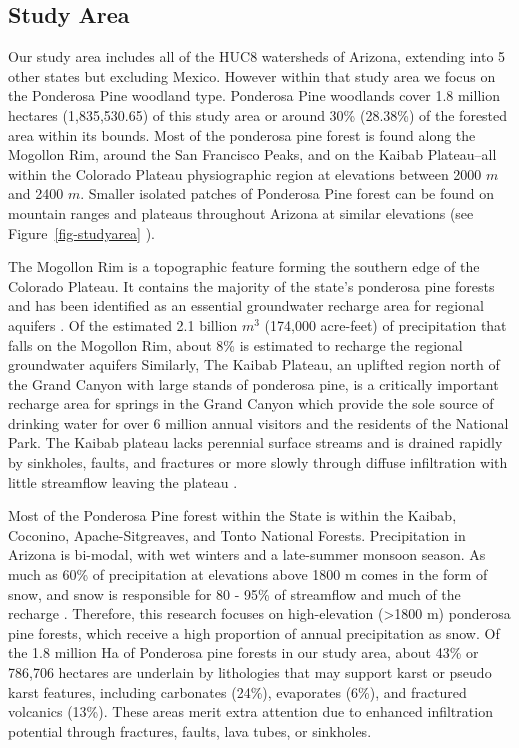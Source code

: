 \documentclass[
  number,
  preprint,
  3p,
  onecolumn]{elsarticle}
\begin{document}
\subsection{Study Area}\label{study-area}

Our study area includes all of the HUC8 watersheds of Arizona, extending
into 5 other states but excluding Mexico. However within that study area
we focus on the Ponderosa Pine woodland type. Ponderosa Pine woodlands
cover 1.8 million hectares (1,835,530.65) of this study area or around
30\% (28.38\%) of the forested area within its bounds. Most of the
ponderosa pine forest is found along the Mogollon Rim, around the San
Francisco Peaks, and on the Kaibab Plateau--all within the Colorado
Plateau physiographic region at elevations between 2000 \(m\) and 2400
\(m\). Smaller isolated patches of Ponderosa Pine forest can be found on
mountain ranges and plateaus throughout Arizona at similar elevations
(see Figure~\ref{fig-studyarea} ).

The Mogollon Rim is a topographic feature forming the southern edge of
the Colorado Plateau. It contains the majority of the state's ponderosa
pine forests and has been identified as an essential groundwater
recharge area for regional aquifers \citep{parker2005}. Of the estimated
2.1 billion \(m^3\) (174,000 acre-feet) of precipitation that falls on
the Mogollon Rim, about 8\% is estimated to recharge the regional
groundwater aquifers\citep{parker2005} Similarly, The Kaibab Plateau, an
uplifted region north of the Grand Canyon with large stands of ponderosa
pine, is a critically important recharge area for springs in the Grand
Canyon which provide the sole source of drinking water for over 6
million annual visitors and the residents of the National
Park\citep{tobin2018}. The Kaibab plateau lacks perennial surface
streams and is drained rapidly by sinkholes, faults, and fractures or
more slowly through diffuse infiltration with little streamflow leaving
the plateau \citep{jones2018, huntoon1974}.

Most of the Ponderosa Pine forest within the State is within the Kaibab,
Coconino, Apache-Sitgreaves, and Tonto National Forests. Precipitation
in Arizona is bi-modal, with wet winters and a late-summer monsoon
season. As much as 60\% of precipitation at elevations above 1800 m
comes in the form of snow, and snow is responsible for 80 - 95\% of
streamflow and much of the recharge
\citep{baker2013, eastoe2023, earman2006}. Therefore, this research
focuses on high-elevation (\textgreater1800 m) ponderosa pine forests,
which receive a high proportion of annual precipitation as snow. Of the
1.8 million Ha of Ponderosa pine forests in our study area, about 43\%
or 786,706 hectares are underlain by lithologies that may support karst
or pseudo karst features, including carbonates (24\%), evaporates (6\%),
and fractured volcanics (13\%). These areas merit extra attention due to
enhanced infiltration potential through fractures, faults, lava tubes,
or sinkholes.
\end{document}

